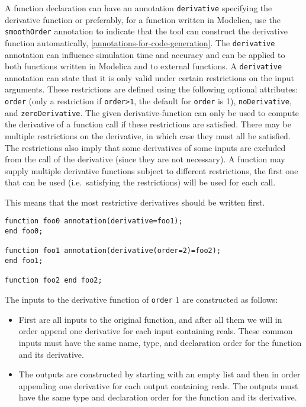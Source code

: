 A function declaration can have an annotation \lstinline!derivative! specifying the derivative function or preferably, for a function written in Modelica, use the \lstinline!smoothOrder! annotation to indicate that the tool can construct the derivative function automatically, \cref{annotations-for-code-generation}.  The \lstinline!derivative! annotation can influence simulation time and accuracy and can be applied to both functions written in Modelica and to external functions.  A \lstinline!derivative! annotation can state that it is only valid under certain restrictions on the input arguments.  These restrictions are defined using the following optional attributes: \lstinline!order! (only a restriction if \lstinline!order>1!, the default for \lstinline!order! is 1), \lstinline!noDerivative!, and \lstinline!zeroDerivative!.  The given derivative-function can only be used to compute the derivative of a function call if these restrictions are satisfied.  There may be multiple restrictions on the derivative, in which case they must all be satisfied. The restrictions also imply that some derivatives of some inputs are excluded from the call of the derivative (since they are not necessary).  A function may supply multiple derivative functions subject to different restrictions, the first one that can be used (i.e.\ satisfying the restrictions) will be used for each call.

\begin{nonnormative}
This means that the most restrictive derivatives should be written first.
\end{nonnormative}

\begin{example}
\begin{lstlisting}[language=modelica]
function foo0 annotation(derivative=foo1);
end foo0;

function foo1 annotation(derivative(order=2)=foo2);
end foo1;

function foo2 end foo2;
\end{lstlisting}
\end{example}

The inputs to the derivative function of \lstinline!order! 1 are constructed as
follows:
\begin{itemize}
\item
  First are all inputs to the original function, and after all them we
  will in order append one derivative for each input containing reals.
  These common inputs must have the same name, type, and declaration
  order for the function and its derivative.
\item
  The outputs are constructed by starting with an empty list and then in
  order appending one derivative for each output containing reals. The
  outputs must have the same type and declaration order for the function
  and its derivative.
\end{itemize}

